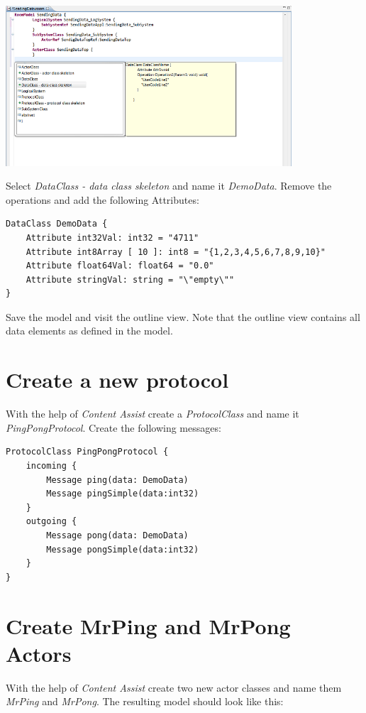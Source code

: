 \includegraphics[width=0.8\textwidth]{images/025-SendingData01.png}

Select \textit{DataClass - data class skeleton} and name it \textit{DemoData}.
Remove the operations and add the following Attributes:

\begin{verbatim}
DataClass DemoData {
    Attribute int32Val: int32 = "4711"
    Attribute int8Array [ 10 ]: int8 = "{1,2,3,4,5,6,7,8,9,10}"
    Attribute float64Val: float64 = "0.0"
    Attribute stringVal: string = "\"empty\""
}
\end{verbatim}

Save the model and visit the outline view.
Note that the outline view contains all data elements as defined in the model. 

\section{Create a new protocol}

With the help of \textit{Content Assist} create a \textit{ProtocolClass} and name it 
\textit{PingPongProtocol}. Create the following messages:

\begin{verbatim} 
ProtocolClass PingPongProtocol {
    incoming {
        Message ping(data: DemoData)
        Message pingSimple(data:int32)
    }
    outgoing {
        Message pong(data: DemoData)
        Message pongSimple(data:int32)
    }
}    
\end{verbatim}

\section{Create MrPing and MrPong Actors}

With the help of \textit{Content Assist} create two new actor classes and name them \textit{MrPing} and 
\textit{MrPong}. The resulting model should look like this:

